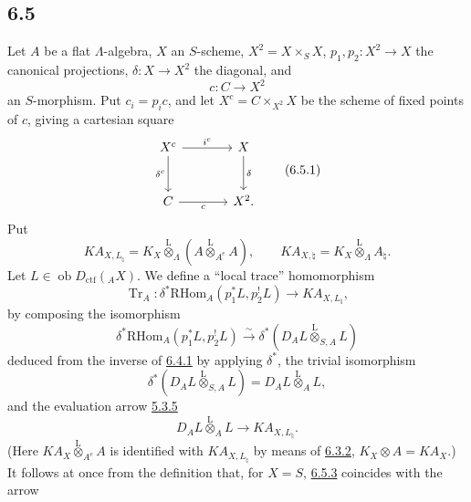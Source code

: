 \documentclass[11pt]{article}
\providecommand{\RHom}{\mathrm{RHom}}
\providecommand{\Tr}{\operatorname{Tr}}
\providecommand{\Tr}{\operatorname{Tr}}
\providecommand{\lten}{\overset{\mathrm L}{\otimes}}
\providecommand{\Ob}{\operatorname{ob}}
\providecommand{\Tr}{\operatorname{Tr}}
\providecommand{\RHom}{\mathrm{RHom}}
\providecommand{\lten}{\overset{\mathrm L}{\otimes}}
\providecommand{\RHom}{\mathrm R\mathcal{H}om}
\providecommand{\lten}{\overset{\mathrm L}{\otimes}}
\providecommand{\Ob}{\operatorname{ob}}
\providecommand{\Tr}{\operatorname{Tr}}
\providecommand{\lten}{\overset{\mathrm L}{\otimes}}
\providecommand{\lten}{\overset{\mathrm L}{\otimes}}
\providecommand{\Ob}{\operatorname{Ob}}
\providecommand{\lten}{\overset{\mathrm L}{\otimes}}
\providecommand{\RHom}{\mathrm{RHom}}
\providecommand{\Tr}{\operatorname{Tr}}
\providecommand{\Ob}{\operatorname{ob}}
\providecommand{\Ob}{\operatorname{Ob}}
\providecommand{\lten}{\overset{\mathrm L}{\otimes}}
\begin{document}
\subsection*{6.5}\label{sga5:IIIB:subsection:6.5}
Let $A$ be a flat $\Lambda$-algebra, $X$ an $S$-scheme, $X^2=X\times_SX$, $p_1,p_2:X^2\to X$ the canonical projections, $\delta:X\to X^2$ the diagonal, and
\[
c:C\longrightarrow X^2
\]
an $S$-morphism. Put $c_i=p_ic$, and let $X^c=C\times_{X^2}X$ be the scheme of fixed points of $c$, giving a cartesian square
\begin{equation}
\begin{tikzcd}[column sep=large,row sep=large]
X^c \arrow[r,"i^c"] \arrow[d,"\delta^c"'] & X \arrow[d,"\delta"]\\
C \arrow[r,"c"'] & X^2 .
\end{tikzcd}
\tag{6.5.1}\label{sga5:IIIB:equation:6.5.1}
\end{equation}
Put
\begin{equation}
KA_{X,L_{\natural}}=K_X\lten_{\Lambda}(A\lten_{A^e}A),
\qquad
KA_{X,\natural}=K_X\lten_{\Lambda}A_{\natural}.
\tag{6.5.2}\label{sga5:IIIB:equation:6.5.2}
\end{equation}
Let $L\in\Ob D_{\mathrm{ctf}}({}_AX)$. We define a “local trace” homomorphism
\begin{equation}
\Tr_A:\delta^*\RHom_A(p_1^*L,p_2^!L)
\longrightarrow
KA_{X,L_{\natural}},
\tag{6.5.3}\label{sga5:IIIB:equation:6.5.3}
\end{equation}
by composing the isomorphism
\begin{equation}
\delta^*\RHom_A(p_1^*L,p_2^!L)
\xrightarrow{\sim}
\delta^*(D_AL\lten_{S,A}L)
\tag{6.5.4}\label{sga5:IIIB:equation:6.5.4}
\end{equation}
deduced from the inverse of \hyperref[sga5:IIIB:equation:6.4.1]{6.4.1} by applying $\delta^*$, the trivial isomorphism
\begin{equation}
\delta^*(D_AL\lten_{S,A}L)=D_AL\lten_AL,
\tag{6.5.5}\label{sga5:IIIB:equation:6.5.5}
\end{equation}
and the evaluation arrow \hyperref[sga5:IIIB:equation:5.3.5]{5.3.5}
\begin{equation}
D_AL\lten_AL\longrightarrow KA_{X,L_{\natural}}.
\tag{6.5.6}\label{sga5:IIIB:equation:6.5.6}
\end{equation}
(Here $KA_X\lten_{A^e}A$ is identified with $KA_{X,L_{\natural}}$ by means of \hyperref[sga5:IIIB:equation:6.3.2]{6.3.2}, $K_X\otimes A=KA_X$.)
It follows at once from the definition that, for $X=S$, \hyperref[sga5:IIIB:equation:6.5.3]{6.5.3} coincides with the arrow
\end{document}
